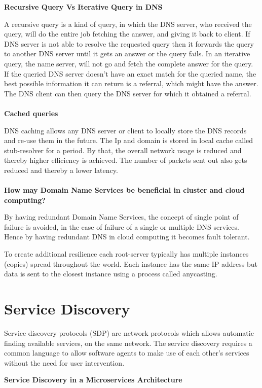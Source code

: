 \textbf{Recursive Query Vs Iterative Query in DNS}

A recursive query is a kind of query, in which the DNS server, who received the query, will do the entire job fetching the answer, and giving it back to client. If DNS server is not able to resolve the requested query then it forwards the query to another DNS server until it gets an answer or the query fails.
In an iterative query, the name server, will not go and fetch the complete answer for the query. If the queried DNS server doesn't have an exact match for the queried name, the best possible information it can return is a referral, which might have the answer. The DNS client can then query the DNS server for which it obtained a referral.
\\\\
\textbf{Cached queries}

DNS caching allows any DNS server or client to locally store the DNS records and re-use them in the future. The Ip and domain is stored in local cache called stub-resolver for a period. By that, the overall network usage is reduced and thereby higher efficiency is achieved. The number of packets sent out also gets reduced and thereby a lower latency. 
\\\\
\textbf{How may Domain Name Services be beneficial in cluster and cloud computing?}


By having redundant Domain Name Services, the concept of single point of failure is avoided, in the case of failure of a single or multiple DNS services. Hence by having redundant DNS in cloud computing it becomes fault tolerant.  
   

To create additional resilience each root-server typically has multiple instances (copies) spread throughout the world. Each instance has the same IP address but data is sent to the closest instance using a process called anycasting.

\section{Service Discovery}
Service discovery protocols (SDP) are network protocols which allows automatic finding available services, on the same network. The service discovery requires a common language to allow software agents to make use of each other's services without the need for user intervention.


\textbf{Service Discovery in a Microservices Architecture}

